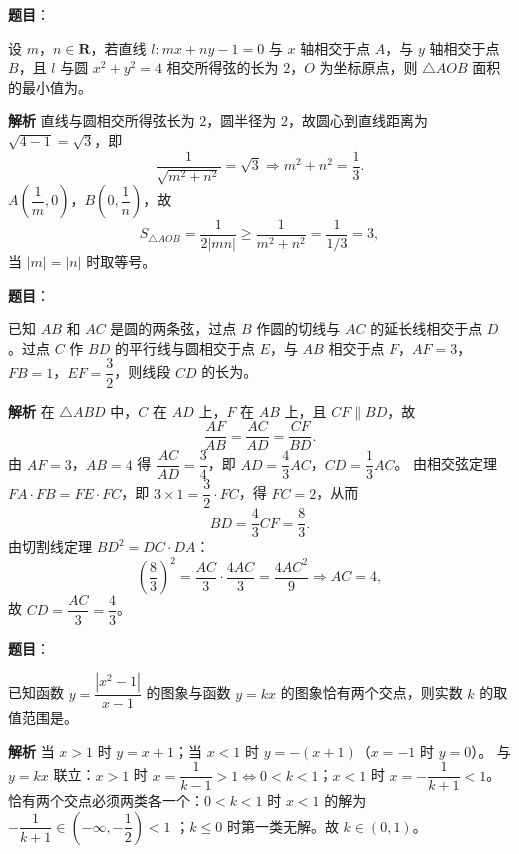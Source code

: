 \begin{answer}

\textbf{题目}：

设 $m$，$n\in\mathbf R$，若直线 $l:mx+ny-1=0$ 与 $x$ 轴相交于点 $A$，与 $y$ 轴相交于点 $B$，且 $l$ 与圆 $x^2+y^2=4$ 相交所得弦的长为 $2$，$O$ 为坐标原点，则 $\triangle AOB$ 面积的最小值为\gkblank{}。

\textbf{解析}
直线与圆相交所得弦长为 $2$，圆半径为 $2$，故圆心到直线距离为 $\sqrt{4-1}=\sqrt3$，即
\nopagebreak[4]
\[\frac1{\sqrt{m^2+n^2}}=\sqrt3\Longrightarrow m^2+n^2=\frac13.\]
$A\left(\dfrac1m,0\right)$，$B\left(0,\dfrac1n\right)$，故
\nopagebreak[4]
\[S_{\triangle AOB}=\frac1{2|mn|}\geqslant\frac1{m^2+n^2}=\frac1{1/3}=3,\]
当 $|m|=|n|$ 时取等号。


\end{answer}
\begin{answer}

\textbf{题目}：

已知 $AB$ 和 $AC$ 是圆的两条弦，过点 $B$ 作圆的切线与 $AC$ 的延长线相交于点 $D$。过点 $C$ 作 $BD$ 的平行线与圆相交于点 $E$，与 $AB$ 相交于点 $F$，$AF=3$，$FB=1$，$EF=\dfrac32$，则线段 $CD$ 的长为\gkblank{}。
\nopagebreak[4]
\begin{center}\end{center}
\nopagebreak[4]
\textbf{解析}
在 $\triangle ABD$ 中，$C$ 在 $AD$ 上，$F$ 在 $AB$ 上，且 $CF\parallel BD$，故
\nopagebreak[4]
\[\frac{AF}{AB}=\frac{AC}{AD}=\frac{CF}{BD}.\]
由 $AF=3$，$AB=4$ 得 $\dfrac{AC}{AD}=\dfrac34$，即 $AD=\dfrac43AC$，$CD=\dfrac13AC$。
由相交弦定理 $FA\cdot FB=FE\cdot FC$，即 $3\times1=\dfrac32\cdot FC$，得 $FC=2$，从而
\nopagebreak[4]
\[BD=\frac43CF=\frac83.\]
由切割线定理 $BD^2=DC\cdot DA$：
\nopagebreak[4]
\[\left(\frac83\right)^2=\frac{AC}3\cdot\frac{4AC}3=\frac{4AC^2}9\Longrightarrow AC=4,\]
故 $CD=\dfrac{AC}3=\dfrac43$。


\end{answer}
\begin{answer}

\textbf{题目}：

已知函数 $y=\dfrac{|x^2-1|}{x-1}$ 的图象与函数 $y=kx$ 的图象恰有两个交点，则实数 $k$ 的取值范围是\gkblank{}。

\textbf{解析}
当 $x>1$ 时 $y=x+1$；当 $x<1$ 时 $y=-(x+1)$（$x=-1$ 时 $y=0$）。
与 $y=kx$ 联立：$x>1$ 时 $x=\dfrac1{k-1}>1\iff0<k<1$；$x<1$ 时 $x=-\dfrac1{k+1}<1$。
恰有两个交点必须两类各一个：$0<k<1$ 时 $x<1$ 的解为 $-\dfrac1{k+1}\in\left(-\infty,-\dfrac12\right)<1$ ；$k\leqslant0$ 时第一类无解。故 $k\in(0,1)$。


\end{answer}
